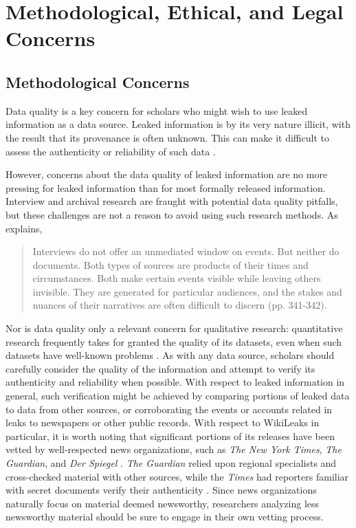 \documentclass[12pt]{article}
\begin{document}
\section*{Methodological, Ethical, and Legal Concerns}

\subsection*{Methodological Concerns}

Data quality is a key concern for scholars who might wish to use leaked information as a data source. 
Leaked information is by its very nature illicit, with the result that its provenance is often unknown. 
This can make it difficult to assess the authenticity 
or reliability of such data \citep{kelly2012wikileaks:}.

However, concerns about the data quality of leaked information are no more pressing for 
leaked information than for most formally released information. Interview and archival research are 
fraught with potential data quality pitfalls, but these challenges are not a reason to avoid 
using such research methods. As \citet{hecht2012being} explains,
\begin{quote}
Interviews do not offer an unmediated window on events. But neither do documents. Both 
types of sources are products of their times and circumstances. Both make certain events visible while 
leaving others invisible. They are generated for particular audiences, and the stakes and nuances 
of their narratives are often difficult to discern (pp. 341-342).
\end{quote}
Nor is data quality only a relevant concern for qualitative research: 
quantitative research frequently takes for granted the quality of its datasets, even 
when such datasets have well-known problems \citep{herrera2007improving}.
As with any data source, scholars should 
carefully consider the quality of the information and attempt to verify its authenticity and 
reliability when possible. With respect to leaked information in general, such verification might be 
achieved by 
comparing portions of leaked data to data from other sources, or corroborating the events or accounts related 
in leaks to newspapers or other public records.
With respect to WikiLeaks in particular, it is worth noting that significant portions of its releases  
have been vetted by well-respected news organizations, such as \emph{The New York Times}, 
\emph{The Guardian}, and \emph{Der Spiegel} \citep{debevec2010professor:}. 
\emph{The Guardian} relied upon regional specialists and cross-checked material with other sources, while
the \emph{Times} had reporters familiar with secret documents verify their 
authenticity \citep{kirchner2010gaining,morisy2010bill}. Since news organizations naturally focus on 
material deemed newsworthy, researchers analyzing less newsworthy material should be sure to engage in 
their own vetting process.
\end{document}
